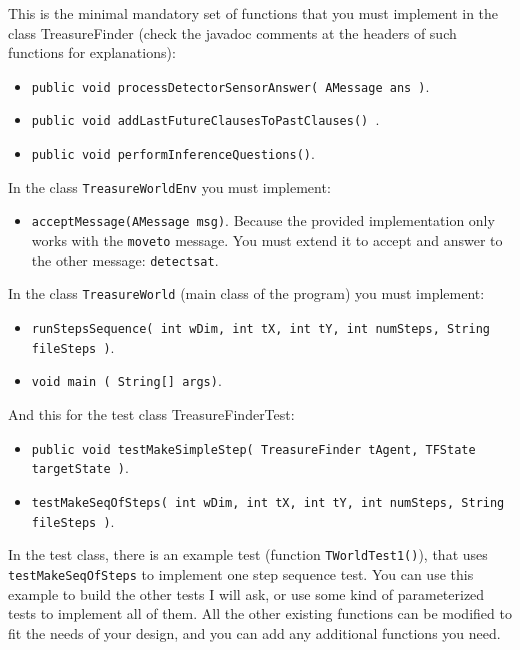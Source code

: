 \documentclass{tufte-handout}
\begin{document}
\begin{fullwidth}
This is the minimal mandatory set of functions that you must implement in the class TreasureFinder
(check the javadoc comments at the headers of such functions for explanations):
\begin{itemize}
\item {\tt public void processDetectorSensorAnswer( AMessage ans )}.
\item {\tt  public void addLastFutureClausesToPastClauses() }.
\item {\tt public void  performInferenceQuestions()}.
\end{itemize}
In the class {\tt TreasureWorldEnv} you must implement:
\begin{itemize}
\item {\tt acceptMessage(AMessage msg)}. Because the provided implementation only works with
the {\tt moveto} message. You must extend it to accept and answer to the other message: {\tt detectsat}. %
\end{itemize}
In the class {\tt TreasureWorld} (main class of the program) you must implement:
\begin{itemize}
\item {\tt runStepsSequence( int wDim, int tX, int tY,
                              int numSteps, String fileSteps  )}.
\item {\tt void main ( String[] args)}.
\end{itemize}
And this for the test class TreasureFinderTest:
\begin{itemize}
\item {\tt public void testMakeSimpleStep(  TreasureFinder tAgent,
                                          TFState targetState )}.
\item {\tt  testMakeSeqOfSteps( int wDim, int tX, int tY,
                                 int numSteps, String fileSteps )}.
\end{itemize}

In the test class, there is an example test (function {\tt  TWorldTest1()}), that uses
{\tt testMakeSeqOfSteps} to implement one step sequence test. You can use this example to build
the other tests I will ask, or use some kind of parameterized tests to implement all of them.
All the other existing functions can be modified to fit the needs of your design,
and you can add any  additional functions you need.
\end{fullwidth}
\end{document}
